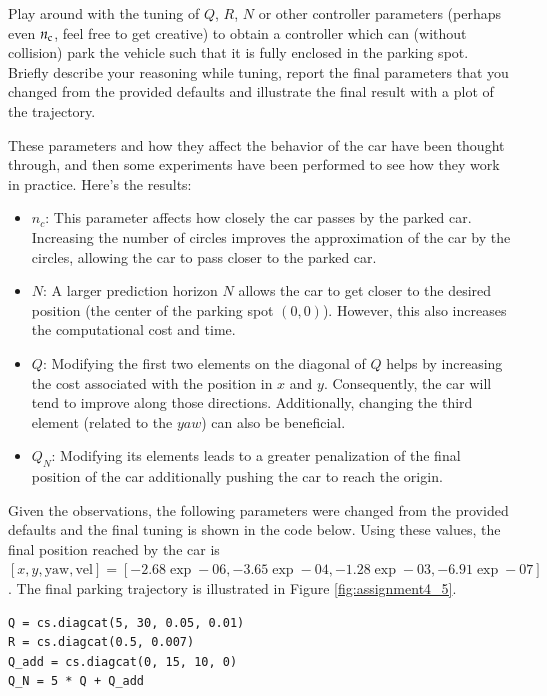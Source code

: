\documentclass[]{article}
\begin{document}
\begin{assignment}
	Play around with the tuning of $Q$, $R$, $N$ or other controller parameters (perhaps even $n_{\mathrm{c}}$, feel free to get creative)
	to obtain a controller which can (without collision) park the vehicle such that it is fully enclosed in the 
	parking spot. Briefly describe your reasoning while tuning, 
	report the final parameters that you changed from the provided defaults
	and illustrate the final result with a plot of the trajectory.
\end{assignment}
\begin{flushleft}
	These parameters and how they affect the behavior of the car have been thought through, and then some experiments have been performed to see how they work in practice. Here's the results:
\end{flushleft}
\begin{itemize}
    \item $n_c$: This parameter affects how closely the car passes by the parked car. Increasing the number of circles improves the approximation of the car by the circles, allowing the car to pass closer to the parked car.
    
    \item $N$: A larger prediction horizon $N$ allows the car to get closer to the desired position (the center of the parking spot $(0,0)$). However, this also increases the computational cost and time.

    \item $Q$: Modifying the first two elements on the diagonal of $Q$ helps by increasing the cost associated with the position in $x$ and $y$. Consequently, the car will tend to improve along those directions. Additionally, changing the third element (related to the $yaw$) can also be beneficial.
    
	\item $Q_N$: Modifying its elements leads to a greater penalization of the final position of the car additionally pushing the car to reach the origin.
\end{itemize}
Given the observations, the following parameters were changed from the provided defaults and the final tuning is shown in the code below. Using these values, the final position reached by the car is $[x, y, \text{yaw}, \text{vel}] = [-2.68\exp-06, -3.65\exp-04, -1.28\exp-03, -6.91\exp-07]$.
The final parking trajectory is illustrated in Figure \ref{fig:assignment4_5}.
\begin{lstlisting}
Q = cs.diagcat(5, 30, 0.05, 0.01)
R = cs.diagcat(0.5, 0.007)
Q_add = cs.diagcat(0, 15, 10, 0)
Q_N = 5 * Q + Q_add
\end{lstlisting}
\end{document}
